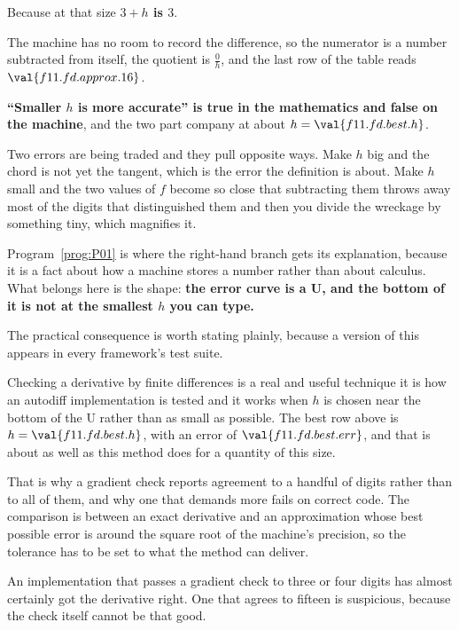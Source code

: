 \begin{fr}
\begin{ansblock}
Because at that size \textbf{$3 + h$ is $3$}.
\end{ansblock}

The machine has no room to record the difference, so the numerator is a number
subtracted from itself, the quotient is $\frac{0}{h}$, and the last row of the
table reads $\val{f11.fd.approx.16}$.

\begin{trapbox}
\textbf{\enquote{Smaller $h$ is more accurate} is true in the mathematics and
false on the machine}, and the two part company at about
$h = \val{f11.fd.best.h}$.

Two errors are being traded and they pull opposite ways. Make $h$ big and the
chord is not yet the tangent, which is the error the definition is about. Make
$h$ small and the two values of $f$ become so close that subtracting them
throws away most of the digits that distinguished them \dash{} and then you
divide the wreckage by something tiny, which magnifies it.

Program~\ref{prog:P01} is where the right-hand branch gets its explanation,
because it is a fact about how a machine stores a number rather than about
calculus. What belongs here is the shape: \textbf{the error curve is a U, and
the bottom of it is not at the smallest $h$ you can type.}
\end{trapbox}

\end{fr}

\begin{fr}
The practical consequence is worth stating plainly, because a version of this
appears in every framework's test suite.

Checking a derivative by finite differences is a real and useful technique
\dash{} it is how an autodiff implementation is tested \dash{} and it works
when $h$ is chosen near the bottom of the U rather than as small as possible.
The best row above is $h = \val{f11.fd.best.h}$, with an error of
$\val{f11.fd.best.err}$, and that is about as well as this method does for a
quantity of this size.

\begin{aibox}
That is why a gradient check reports agreement to a handful of digits rather
than to all of them, and why one that demands more fails on correct code. The
comparison is between an exact derivative and an approximation whose best
possible error is around the square root of the machine's precision, so the
tolerance has to be set to what the method can deliver.

An implementation that passes a gradient check to three or four digits has
almost certainly got the derivative right. One that agrees to fifteen is
suspicious, because the check itself cannot be that good.
\end{aibox}
\end{fr}

